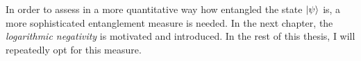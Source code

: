 In order to assess in a more quantitative way how entangled the state $\ket{\psi}$ is, a more sophisticated entanglement measure is needed. In the next chapter, the \emph{logarithmic negativity} is motivated and introduced. In the rest of this thesis, I will repeatedly opt for this measure.